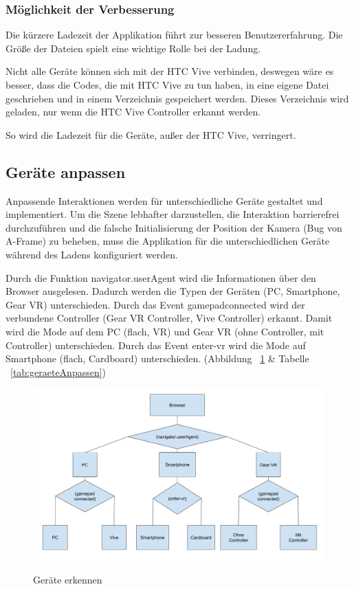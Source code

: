   \subsubsection{Möglichkeit der Verbesserung}
  Die kürzere Ladezeit der Applikation führt zur besseren Benutzererfahrung. Die Größe der Dateien spielt eine wichtige Rolle bei der Ladung.
  
  Nicht alle Geräte können sich mit der HTC Vive verbinden, deswegen wäre es besser, dass die Codes, die mit HTC Vive zu tun haben, in eine eigene Datei geschrieben und in einem Verzeichnis gespeichert werden. Dieses Verzeichnis wird geladen, nur wenn die HTC Vive Controller erkannt werden.
  
  So wird die Ladezeit für die Geräte, außer der HTC Vive, verringert.
  
 \subsection{Geräte anpassen}
 Anpassende Interaktionen werden für unterschiedliche Geräte gestaltet und implementiert. Um die Szene lebhafter darzustellen, die Interaktion barrierefrei durchzuführen und die falsche Initialisierung der Position der Kamera (Bug von A-Frame) zu beheben, muss die Applikation für die unterschiedlichen Geräte während des Ladens konfiguriert werden.
 
 Durch die Funktion {\selectfont navigator.userAgent} wird die Informationen über den Browser ausgelesen. Dadurch werden die Typen der Geräten (PC, Smartphone, Gear VR) unterschieden. Durch das Event {\selectfont gamepadconnected} wird der verbundene Controller (Gear VR Controller, Vive Controller) erkannt. Damit wird die Mode auf dem PC (flach, VR) und Gear VR (ohne Controller, mit Controller) unterschieden. Durch das Event {\selectfont enter-vr} wird die Mode auf Smartphone (flach, Cardboard) unterschieden. (Abbildung ~\ref{fig:geraeteAnpassen} \& Tabelle ~\ref{tab:geraeteAnpassen}) 
 
\begin{figure}[ht]
\vspace*{1em}
\centering
\caption[Geräte erkennen]{Geräte erkennen}
\includegraphics[width=\textwidth]{images/geraeteAnpassen.png}
\label{fig:geraeteAnpassen} 
\end{figure}


